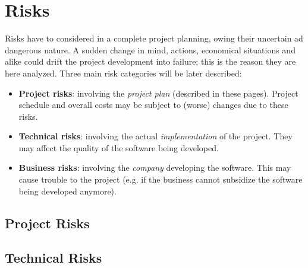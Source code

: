 \section{Risks}
Risks have to considered in a complete project planning, owing their uncertain ad dangerous nature. A sudden change in mind, actions, economical situations and alike could drift the project development into failure; this is the reason they are here analyzed. Three main risk categories will be later described:
\begin{itemize}
    \item \textbf{Project risks}: involving the \emph{project plan} (described in these pages). Project schedule and overall costs may be subject to (worse) changes due to these risks.
    \item \textbf{Technical risks}: involving the actual \emph{implementation} of the project. They may affect the quality of the software being developed.
    \item \textbf{Business risks}: involving the \emph{company} developing the software. This may cause trouble to the project (e.g. if the business cannot subsidize the software being developed anymore).
\end{itemize}

\subsection{Project Risks}

\begin{itemize}
\end{itemize}

\subsection{Technical Risks}

\begin{itemize}
\end{itemize}


